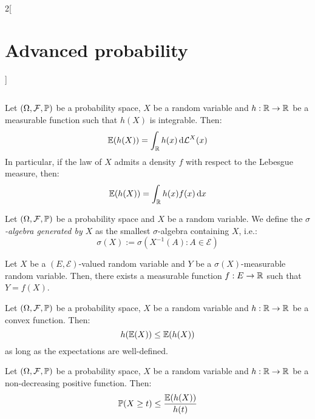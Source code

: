 \documentclass[../../../main_math.tex]{subfiles}
\begin{document}
\begin{multicols}{2}[\section{Advanced probability}]
\begin{definition}
$$    $$
  \end{definition}
  \begin{proposition}
    Let $(\Omega,\mathcal{F},\mathbb{P})$ be a probability space, $X$ be a random variable and $h:\mathbb{R}\to \mathbb{R}$ be a measurable function such that $h(X)$ is integrable. Then:
    $$
      \mathbb{E}(h(X))=\int_{\mathbb{R}}{h(x)\dd{\mathcal{L}^X(x)}}
    $$
    In particular, if the law of $X$ admits a density $f$ with respect to the Lebesgue measure, then:
    $$
      \mathbb{E}(h(X))=\int_{\mathbb{R}}{h(x)f(x)\dd{x}}
    $$
  \end{proposition}
  \begin{definition}
    Let $(\Omega,\mathcal{F},\mathbb{P})$ be a probability space and $X$ be a random variable. We define the \emph{$\sigma$-algebra generated by $X$} as the smallest $\sigma$-algebra containing $X$, i.e.:
    $$
      \sigma(X):=\sigma(X^{-1}(A):A\in\mathcal{E})
    $$
  \end{definition}
  \begin{proposition}
    Let $X$ be a $(E,\mathcal{E})$-valued random variable and $Y$ be a $\sigma(X)$-measurable random variable. Then, there exists a measurable function $f:E\to \mathbb{R}$ such that $Y=f(X)$.
  \end{proposition}
  \begin{proposition}
    Let $(\Omega,\mathcal{F},\mathbb{P})$ be a probability space, $X$ be a random variable and $h:\mathbb{R}\to \mathbb{R}$ be a convex function. Then:
    $$
      h(\mathbb{E}(X))\leq \mathbb{E}(h(X))
    $$
    as long as the expectations are well-defined.
  \end{proposition}
  \begin{proposition}
    Let $(\Omega,\mathcal{F},\mathbb{P})$ be a probability space, $X$ be a random variable and $h:\mathbb{R}\to \mathbb{R}$ be a non-decreasing positive function. Then:
    $$
      \mathbb{P}(X\geq t)\leq \frac{\mathbb{E}(h(X))}{h(t)}
    $$
  \end{proposition}

\end{multicols}
\end{document}
